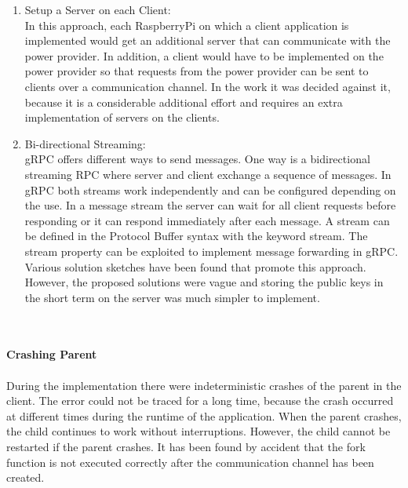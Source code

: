 \begin{enumerate}
\item Setup a Server on each Client:\\
In this approach, each RaspberryPi on which a client application is implemented would get an additional server that can communicate with the power provider. In addition, a client would have to be implemented on the power provider so that requests from the power provider can be sent to clients over a communication channel. In the work it was decided against it, because it is a considerable additional effort and requires an extra implementation of servers on the clients.
\item Bi-directional Streaming:\\
gRPC offers different ways to send messages. One way is a bidirectional streaming RPC where server and client exchange a sequence of messages. In gRPC both streams work independently and can be configured depending on the use.%
In a message stream the server can wait for all client requests before responding or it can respond immediately after each message.  A stream can be defined in the Protocol Buffer syntax with the keyword stream. The stream property can be exploited to implement message forwarding in gRPC. Various solution sketches have been found that promote this approach. However, the proposed solutions were vague and storing the public keys in the short term on the server was much simpler to implement. 

\end{enumerate}\\
\\
\textbf{Crashing Parent}
\\
\\
During the implementation there were indeterministic crashes of the parent in the client. The error could not be traced for a long time, because the crash occurred at different times during the runtime of the application. When the parent crashes, the child continues to work without interruptions. However, the child cannot be restarted if the parent crashes. It has been found by accident that the fork function is not executed correctly after the communication channel has been created.  



\cleardoublepage